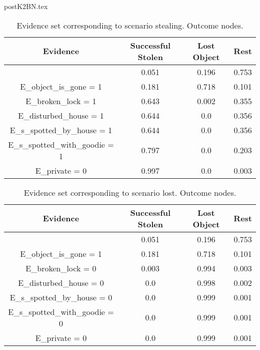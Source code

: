 postK2BN.tex\begin{table}\begin{tabular}{c|c|c|c}Evidence & Successful Stolen & Lost Object & Rest \\\hline & 0.051 & 0.196 & 0.753 \\E\_object\_is\_gone = 1 & 0.181 & 0.718 & 0.101 \\E\_broken\_lock = 1 & 0.643 & 0.002 & 0.355 \\E\_disturbed\_house = 1 & 0.644 & 0.0 & 0.356 \\E\_s\_spotted\_by\_house = 1 & 0.644 & 0.0 & 0.356 \\E\_s\_spotted\_with\_goodie = 1 & 0.797 & 0.0 & 0.203 \\E\_private = 0 & 0.997 & 0.0 & 0.003 \\\end{tabular}\caption{Evidence set corresponding to scenario stealing. Outcome nodes.}\end{table}
\begin{table}\begin{tabular}{c|c|c|c}Evidence & Successful Stolen & Lost Object & Rest \\\hline & 0.051 & 0.196 & 0.753 \\E\_object\_is\_gone = 1 & 0.181 & 0.718 & 0.101 \\E\_broken\_lock = 0 & 0.003 & 0.994 & 0.003 \\E\_disturbed\_house = 0 & 0.0 & 0.998 & 0.002 \\E\_s\_spotted\_by\_house = 0 & 0.0 & 0.999 & 0.001 \\E\_s\_spotted\_with\_goodie = 0 & 0.0 & 0.999 & 0.001 \\E\_private = 0 & 0.0 & 0.999 & 0.001 \\\end{tabular}\caption{Evidence set corresponding to scenario lost. Outcome nodes.}\end{table}